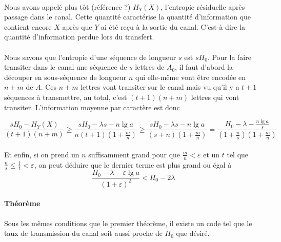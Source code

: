 	\paragraph{}
	Nous avons appelé plus tôt (référence ?) $H_Y(X)$, l'entropie résiduelle 
	après passage dans le canal. Cette quantité caractérise la quantité 
	d'information que contient encore $X$ après que $Y$ ai été reçu à la 
	sortie du canal. C'est-à-dire la quantité d'information perdue lors 
	du transfert.
	
	\paragraph{}
	Nous savons que l'entropie d'une séquence de longueur $s$ est $sH_0$. 
	Pour la faire transiter dans le canal une séquence de $s$ lettres de $A_0$,
	il faut d'abord la découper en sous-séquence de longueur $n$ qui elle-même 
	vont être encodée en $n+m$ de $A$. Ces $n+m$ lettres vont transiter sur le 
	canal mais vu qu'il y a $t+1$ séquences à transmettre, au total, c'est 
	$(t+1)(n+m)$ lettres qui vont transiter. L'information moyenne par 
	caractère est donc
	
	\[
		\frac{sH_0-H_Y(X)}{(t+1)(n+m)} \ge 
		\frac{sH_0-\lambda s-n\lg a}{n(t+1)(1+\frac{m}{n})} \ge 
		\frac{sH_0-\lambda s-n\lg a}{(s+n)(1+\frac{m}{n})} = 
		\frac{H_0-\lambda-\frac{n\lg a}{s}}{(1+\frac{n}{s})(1+\frac{m}{n})}
	\]
	
	\paragraph{}
	Et enfin, si on prend un $n$ suffisamment grand pour que 
	$\frac{m}{n}<\varepsilon$ et un $t$ tel que
	$\frac{n}{s} \le \frac{1}{t} < \varepsilon$, on peut 
	déduire que le dernier terme est plus grand ou égal à
	\[\frac{H_0-\lambda-\varepsilon\lg a}{(1+\varepsilon)^2}<H_0-2\lambda\]
	
	
	
	
	
	
	
	
	\paragraph{Théorème}
	Sous les mêmes conditions que le premier théorème, il existe un code tel
	que le taux de transmission du canal soit aussi proche de $H_0$ que désiré.

